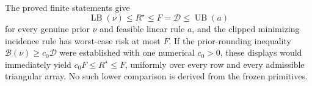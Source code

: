 The proved finite statements give
\[
 \operatorname{LB}(\nu)\le R^{\star}\le F=\mathcal D\le\operatorname{UB}(a)
\]
for every genuine prior \(\nu\) and feasible linear rule \(a\), and the clipped minimizing incidence rule has worst-case risk at most \(F\).  If the prior-rounding inequality \(\mathcal B(\nu)\ge c_0\mathcal D\) were established with one numerical \(c_0>0\), these displays would immediately yield \(c_0F\le R^{\star}\le F\), uniformly over every row and every admissible triangular array.  No such lower comparison is derived from the frozen primitives.